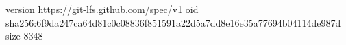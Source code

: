 version https://git-lfs.github.com/spec/v1
oid sha256:6f9da247ca64d81c0c08836f851591a22d5a7dd8e16e35a77694b04114de987d
size 8348
